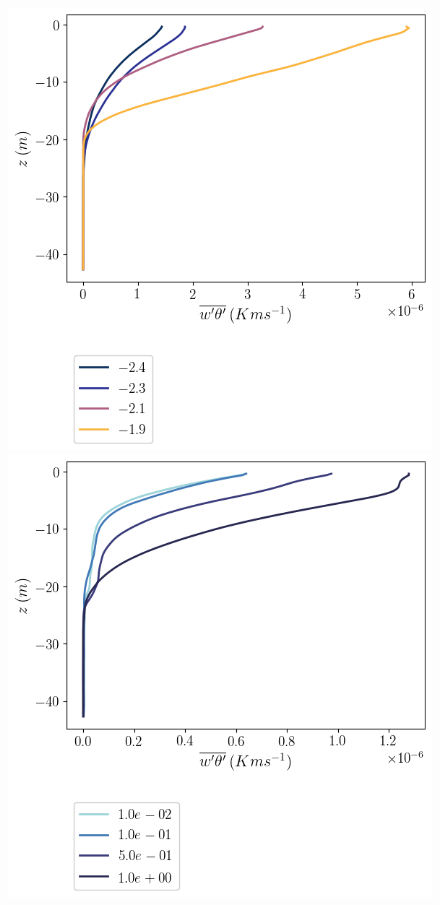 \documentclass[draft]{agujournal2019}
\begin{document}
\begin{figure}[h!]
    \centering
    \begin{minipage}{0.5\textwidth}
        \includegraphics[trim={0 4cm 0 0},clip,width=\textwidth]{Figures/heatflux_cmp_dT_44h_tav12_z_profile.png}
    \end{minipage}%
    \begin{minipage}{0.5\textwidth}
        \includegraphics[trim={0 4cm 0 0},clip,width=\textwidth]{Figures/heatflux_cmp_slope_46h_tav12_z_profile.png}

\end{minipage}
\end{figure}
\end{document}
